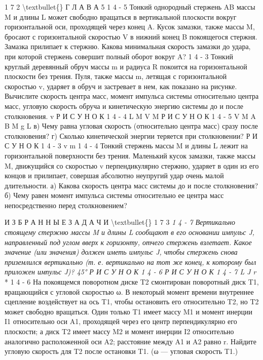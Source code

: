 \documentclass[10pt,oneside]{article}
\begin{document}
1 7 2 \textbackslash{}textbullet\{\} Г Л А В А  5 \emph{ } 1 4 - 5 Тонкий однородный стержень AB массы M и длины L может свободно вращаться в вертикальной плоскости вокруг горизонтальной оси, проходящей через конец A. Кусок замазки, также массы M, бросают с горизонтальной скоростью V в нижний конец B покоящегося стержня. Замазка прилипает к стержню. Какова минимальная скорость замазки до удара, при которой стержень совершит полный оборот вокруг A? \emph{ } 1 4 - 3 Тонкий круглый деревянный обруч массы m и радиуса R покоится на горизонтальной плоскости без трения. Пуля, также массы m, летящая с горизонтальной скоростью v, ударяет в обруч и застревает в нем, как показано на рисунке. Вычислите скорость центра масс, момент импульса системы относительно центра масс, угловую скорость обруча и кинетическую энергию системы до и после столкновения. v Р И С У Н О К  1 4 - 4 L M V M Р И С У Н О К  1 4 - 5 V M A B M g L в) Чему равна угловая скорость (относительно центра масс) сразу после столкновения? г) Сколько кинетической энергии теряется при столкновении? Р И С У Н О К  1 4 - 3 v m \emph{ } 1 4 - 4 Тонкий стержень массы M и длины L лежит на горизонтальной поверхности без трения. Маленький кусок замазки, также массы M, движущийся со скоростью v перпендикулярно стержню, ударяет в один из его концов и прилипает, совершая абсолютно неупругий удар очень малой длительности. а) Какова скорость центра масс системы до и после столкновения? б) Чему равен момент импульса системы относительно ее центра масс непосредственно перед столкновением?\par

И З Б Р А Н Н Ы Е  З А Д А Ч И \textbackslash{}textbullet\{\} 1 7 3 \emph{ } \emph{ 1 4 - 7 Вертикально стоящему стержню массы M и длины L сообщают в его основании импульс J, направленный под углом вверх к горизонту, отчего стержень взлетает. Какое значение (или значения) должен иметь импульс J, чтобы стержень снова приземлился вертикально (т. е. вертикально на тот же конец, к которому был приложен импульс J)? 45° Р И С У Н О К  1 4 - 6 Р И С У Н О К  1 4 - 7 L J r } * 1 4 - 6 На покоящемся поворотном диске T2 смонтирован поворотный диск T1, вращающийся с угловой скоростью ω. В некоторый момент времени внутреннее сцепление воздействует на ось T1, чтобы остановить его относительно T2, но T2 может свободно вращаться. Один только T1 имеет массу M1 и момент инерции I1 относительно оси A1, проходящей через его центр перпендикулярно его плоскости; а диск T2 имеет массу M2 и момент инерции I2 относительно аналогично расположенной оси A2; расстояние между A1 и A2 равно r. Найдите угловую скорость для T2 после остановки T1. (ω --- угловая скорость T1.)\par
\end{document}
